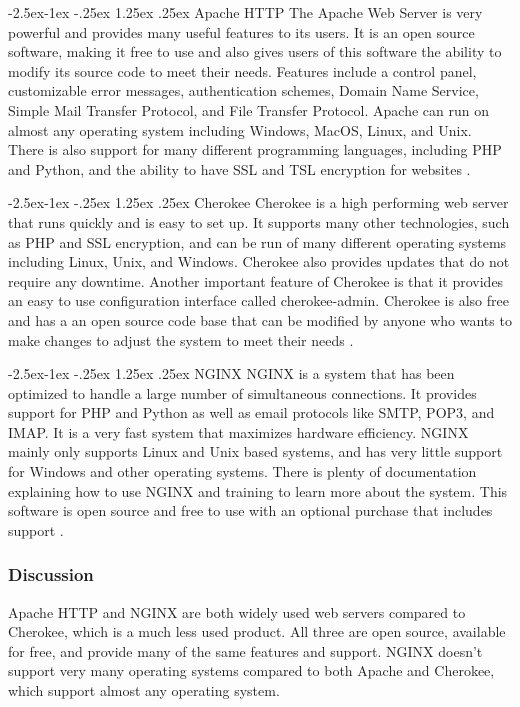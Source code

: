 \documentclass[onecolumn, draftclsnofoot,10pt, compsoc]{IEEEtran}
\makeatletter
\renewcommand\paragraph{\@startsection{paragraph}{4}{\z@}%
            {-2.5ex\@plus -1ex \@minus -.25ex}%
            {1.25ex \@plus .25ex}%
            {\normalfont\normalsize\bfseries}}
\makeatother
\begin{document}
\paragraph{Apache HTTP}
The Apache Web Server is very powerful and provides many useful features to its users. It is an open source software, making it free to use and also gives users of this software the ability to modify its source code to meet their needs. Features include a control panel, customizable error messages, authentication schemes, Domain Name Service, Simple Mail Transfer Protocol, and File Transfer Protocol. Apache can run on almost any operating system including Windows, MacOS, Linux, and Unix. There is also support for many different programming languages, including PHP and Python, and the ability to have SSL and TSL encryption for websites \cite{apache}.

\paragraph{Cherokee}
Cherokee is a high performing web server that runs quickly and is easy to set up. It supports many other technologies, such as PHP and SSL encryption, and can be run of many different operating systems including Linux, Unix, and Windows. Cherokee also provides updates that do not require any downtime. Another important feature of Cherokee is that it provides an easy to use configuration interface called cherokee-admin. Cherokee is also free and has a an open source code base that can be modified by anyone who wants to make changes to adjust the system to meet their needs \cite{cherokee}.

\paragraph{NGINX}
NGINX is a system that has been optimized to handle a large number of simultaneous connections. It provides support for PHP and Python as well as email protocols like SMTP, POP3, and IMAP. It is a very fast system that maximizes hardware efficiency. NGINX mainly only supports Linux and Unix based systems, and has very little support for Windows and other operating systems. There is plenty of documentation explaining how to use NGINX and training to learn more about the system. This software is open source and free to use with an optional purchase that includes support \cite{nginx}.

\subsubsection{Discussion}
Apache HTTP and NGINX are both widely used web servers compared to Cherokee, which is a much less used product. All three are open source, available for free, and provide many of the same features and support. NGINX doesn't support very many operating systems compared to both Apache and Cherokee, which support almost any operating system.
\end{document}
